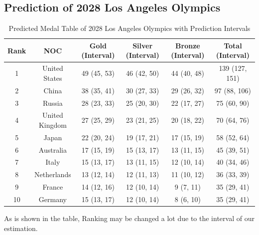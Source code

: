 \subsection{Prediction of 2028 Los Angeles Olympics}
\begin{table}[htbp]
    \centering
    \caption{Predicted Medal Table of 2028 Los Angeles Olympics with Prediction Intervals}
    \begin{tabular}{|c|c|c|c|c|c|}
        \hline
        Rank & NOC & Gold (Interval) & Silver (Interval) & Bronze (Interval) & Total (Interval) \\
        \hline
        1 & United States & 49 (45, 53) & 46 (42, 50) & 44 (40, 48) & 139 (127, 151) \\
        2 & China & 38 (35, 41) & 30 (27, 33) & 29 (26, 32) & 97 (88, 106) \\
        3 & Russia & 28 (23, 33) & 25 (20, 30) & 22 (17, 27) & 75 (60, 90) \\
        4 & United Kingdom & 27 (25, 29) & 23 (21, 25) & 20 (18, 22) & 70 (64, 76) \\
        5 & Japan & 22 (20, 24) & 19 (17, 21) & 17 (15, 19) & 58 (52, 64) \\
        6 & Australia & 17 (15, 19) & 15 (13, 17) & 13 (11, 15) & 45 (39, 51) \\
        7 & Italy & 15 (13, 17) & 13 (11, 15) & 12 (10, 14) & 40 (34, 46) \\
        8 & Netherlands & 13 (12, 14) & 12 (11, 13) & 11 (10, 12) & 36 (33, 39) \\
        9 & France & 14 (12, 16) & 12 (10, 14) & 9 (7, 11) & 35 (29, 41) \\
        10 & Germany & 15 (13, 17) & 12 (10, 14) & 8 (6, 10) & 35 (29, 41) \\
        \hline
    \end{tabular}
    \label{tab:2028}
\end{table}

As is shown in the table, Ranking may be changed a lot due to the interval of our estimation.

